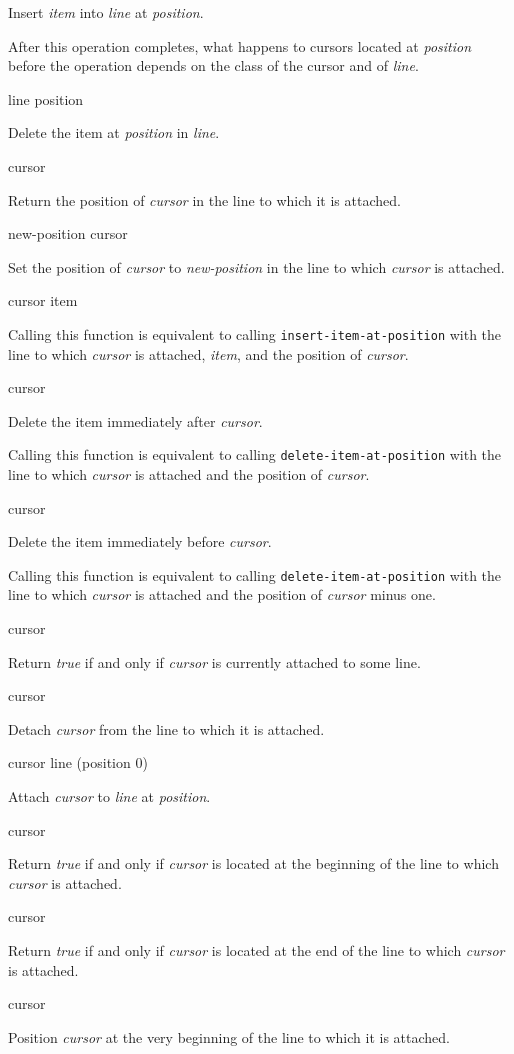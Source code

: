 Insert \textit{item} into \textit{line} at \textit{position}.

After this operation completes, what happens to cursors located at
\textit{position} before the operation depends on the class of the
cursor and of \textit{line}.

 {line position}

Delete the item at \textit{position} in \textit{line}.

 {cursor}

Return the position of \textit{cursor} in the line to which it is
attached.

 {new-position cursor}

Set the position of \textit{cursor} to \textit{new-position} in the
line to which \textit{cursor} is attached.

 {cursor item}

Calling this function is equivalent to calling
\texttt{insert-item-at-position} with the line to which
\textit{cursor} is attached, \textit{item}, and the position of
\textit{cursor}.

 {cursor}

Delete the item immediately after \emph{cursor}.

Calling this function is equivalent to calling
\texttt{delete-item-at-position} with the line to which
\textit{cursor} is attached and the position of \textit{cursor}.

 {cursor}

Delete the item immediately before \emph{cursor}.

Calling this function is equivalent to calling
\texttt{delete-item-at-position} with the line to which
\textit{cursor} is attached and the position of \textit{cursor} minus
one.

 {cursor}

Return \emph{true} if and only if \textit{cursor} is currently
attached to some line.

 {cursor}

Detach \textit{cursor} from the line to which it is attached.

 {cursor line \optional (position 0)}

Attach \textit{cursor} to \textit{line} at \textit{position}.

 {cursor}

Return \textit{true} if and only if \textit{cursor} is located at the
beginning of the line to which \textit{cursor} is attached.

 {cursor}

Return \textit{true} if and only if \textit{cursor} is located at the
end of the line to which \textit{cursor} is attached.

 {cursor}

Position \textit{cursor} at the very beginning of the line to which it
is attached.
